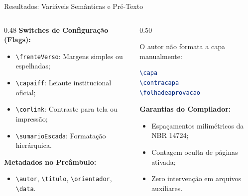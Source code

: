 \documentclass[aspectratio=169, 10pt]{beamer}
\begin{document}
\begin{frame}[fragile]{Resultados: Variáveis Semânticas e Pré-Texto}
  \begin{columns}[T]
    \begin{column}{0.48\textwidth}
      \textbf{Switches de Configuração (Flags):}
      \begin{itemize}\setlength{\itemsep}{1.5pt}
        \item \verb|\frenteVerso|: Margens simples ou espelhadas;
        \item \verb|\capaiff|: Leiaute institucional oficial;
        \item \verb|\corlink|: Contraste para tela ou impressão;
        \item \verb|\sumarioEscada|: Formatação hierárquica.
      \end{itemize}
      \vspace{0.08cm}
      \textbf{Metadados no Preâmbulo:}
      \begin{itemize}\setlength{\itemsep}{1pt}
        \item \verb|\autor|, \verb|\titulo|, \verb|\orientador|, \verb|\data|.
      \end{itemize}
    \end{column}

    \begin{column}{0.50\textwidth}
      \begin{tcolorbox}[colback=codebg,colframe=iffdark,arc=1.5mm,title=\textbf{Geração com Comandos Únicos}]
        \scriptsize
        O autor não formata a capa manualmente:
        \begin{lstlisting}[language=TeX]
\capa
\contracapa
\folhadeaprovacao
        \end{lstlisting}
        \vspace{0.05cm}
        \textbf{Garantias do Compilador:}
        \begin{itemize}\setlength{\itemsep}{1pt}
          \item Espaçamentos milimétricos da NBR 14724;
          \item Contagem oculta de páginas ativada;
          \item Zero intervenção em arquivos auxiliares.
        \end{itemize}
      \end{tcolorbox}
    \end{column}
  \end{columns}
\end{frame}
\end{document}
